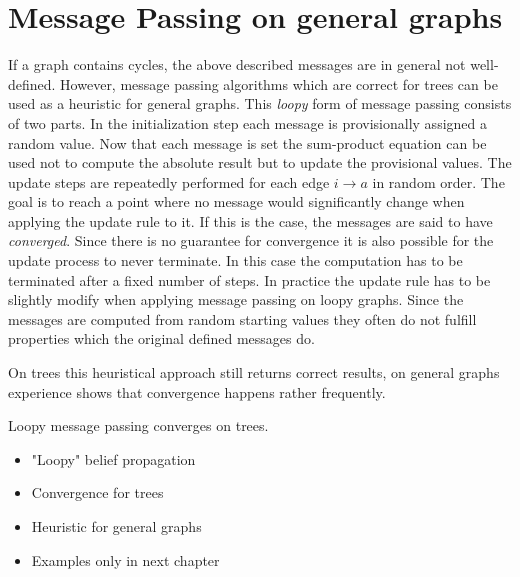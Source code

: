 \section{Message Passing on general graphs}
If a graph contains cycles, the above described messages are in general not well-defined. However, message passing algorithms which are correct for trees can be used as a heuristic for general graphs. \newline
This \emph{loopy} form of message passing consists of two parts. In the initialization  step each message is provisionally assigned a random value. Now that each message is set the sum-product equation can be used not to compute the absolute result but to update the provisional values. The update steps are repeatedly performed for each edge $i \rightarrow a$ in random order. The goal is to reach a point where no message would significantly change when applying the update rule to it. If this is the case, the messages are said to have \emph{converged}. Since there is no guarantee for convergence it is also possible for the update process to never terminate. In this case the computation has to be terminated after a fixed number of steps. \newline
In practice the update rule has to be slightly modify when applying message passing on loopy graphs. Since the messages are computed from random starting values they often do not fulfill properties which the original defined messages do.

On trees this heuristical approach still returns correct results, on general graphs experience shows that convergence happens rather frequently.

\begin{lemma}
Loopy message passing converges on trees.
\end{lemma}

\begin{itemize}
	\item "Loopy" belief propagation
	\item Convergence for trees
	\item Heuristic for general graphs
	\item Examples only in next chapter
\end{itemize}

